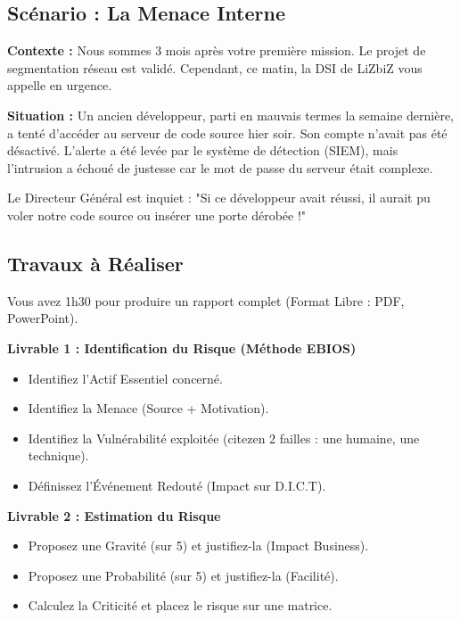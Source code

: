 \subsection{Scénario : La Menace Interne}

\begin{boxlizbiz}
\textbf{Contexte :}
Nous sommes 3 mois après votre première mission. Le projet de segmentation réseau est validé. Cependant, ce matin, la DSI de LiZbiZ vous appelle en urgence.

\textbf{Situation :} Un ancien développeur, parti en mauvais termes la semaine dernière, a tenté d'accéder au serveur de code source hier soir. Son compte n'avait pas été désactivé. L'alerte a été levée par le système de détection (SIEM), mais l'intrusion a échoué de justesse car le mot de passe du serveur était complexe.

Le Directeur Général est inquiet : "Si ce développeur avait réussi, il aurait pu voler notre code source ou insérer une porte dérobée !"
\end{boxlizbiz}

\subsection{Travaux à Réaliser}

Vous avez 1h30 pour produire un rapport complet (Format Libre : PDF, PowerPoint).

\textbf{Livrable 1 : Identification du Risque (Méthode EBIOS)}
\begin{itemize}
    \item Identifiez l'Actif Essentiel concerné.
    \item Identifiez la Menace (Source + Motivation).
    \item Identifiez la Vulnérabilité exploitée (citezen 2 failles : une humaine, une technique).
    \item Définissez l'Événement Redouté (Impact sur D.I.C.T).
\end{itemize}

\textbf{Livrable 2 : Estimation du Risque}
\begin{itemize}
    \item Proposez une Gravité (sur 5) et justifiez-la (Impact Business).
    \item Proposez une Probabilité (sur 5) et justifiez-la (Facilité).
    \item Calculez la Criticité et placez le risque sur une matrice.
\end{itemize}

